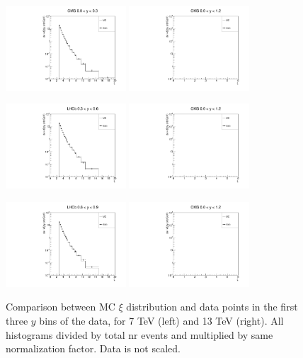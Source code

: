 \documentclass{article}
\begin{document}
\begin{figure}[h!]
\centering
\includegraphics[width = 0.4\textwidth]{plots/xi_CMS_y1_7.pdf}
\includegraphics[width = 0.4\textwidth]{plots/xi_CMS_13.pdf}

\includegraphics[width = 0.4\textwidth]{plots/xi_CMS_y2_7.pdf}
\includegraphics[width = 0.4\textwidth]{plots/xi_CMS_13.pdf}

\includegraphics[width = 0.4\textwidth]{plots/xi_CMS_y3_7.pdf}
\includegraphics[width = 0.4\textwidth]{plots/xi_CMS_13.pdf}
\caption{Comparison between MC $\xi$ distribution and data points in the first three $y$ bins of the data, for 7 TeV (left) and 13 TeV (right). All histograms divided by total nr events and multiplied by same normalization factor. Data is not scaled.}\label{f:xi_comp_1}
\end{figure}
\end{document}
